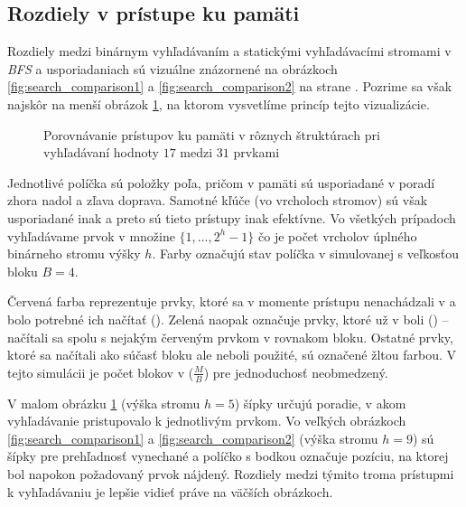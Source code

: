 \subsection{Rozdiely v prístupe ku pamäti} \label{sec:memaccess_patterns}
Rozdiely medzi binárnym vyhľadávaním a statickými vyhľadávacími stromami v \emph{BFS} a \vEB usporiadaniach sú vizuálne znázornené na obrázkoch \ref{fig:search_comparison1} a \ref{fig:search_comparison2} na strane \pageref{fig:search_comparison1}. Pozrime sa však najskôr na menší obrázok \ref{fig:search_comparison_small}, na ktorom vysvetlíme princíp tejto vizualizácie.

\begin{figure}[h]
    \centering
    \caption[Porovnávanie prístupov ku pamäti pri vyhľadávaní hodnoty $17$]{Porovnávanie prístupov ku pamäti v rôznych štruktúrach pri vyhľadávaní hodnoty $17$ medzi $31$ prvkami}
    \label{fig:search_comparison_small}
\end{figure}

Jednotlivé políčka sú položky poľa, pričom v pamäti sú usporiadané v poradí zhora nadol a zľava doprava. Samotné kľúče (vo vrcholoch stromov) sú však usporiadané inak a preto sú tieto prístupy inak efektívne. Vo všetkých prípadoch vyhľadávame prvok v množine $\{1, \dotsc, 2^h-1\}$ čo je počet vrcholov úplného binárneho stromu výšky $h$. Farby označujú stav políčka v simulovanej \cache s veľkosťou bloku $B=4$. 

Červená farba reprezentuje prvky, ktoré sa v momente prístupu nenachádzali v \cache a bolo potrebné ich načítať (\miss). Zelená naopak označuje prvky, ktoré už v \cache boli (\hit) -- načítali sa spolu s nejakým červeným prvkom v rovnakom bloku. Ostatné prvky, ktoré sa načítali ako súčasť bloku ale neboli použité, sú označené žltou farbou. V tejto simulácii je počet blokov v \cache ($\frac{M}{B}$) pre jednoduchosť neobmedzený.

V malom obrázku \ref{fig:search_comparison_small} (výška stromu $h=5$) šípky určujú poradie, v akom vyhľadávanie pristupovalo k jednotlivým prvkom. Vo veľkých obrázkoch \ref{fig:search_comparison1} a \ref{fig:search_comparison2} (výška stromu $h=9$) sú šípky pre prehľadnosť vynechané a políčko s bodkou označuje pozíciu, na ktorej bol napokon požadovaný prvok nájdený. Rozdiely medzi týmito troma prístupmi k vyhľadávaniu je lepšie vidieť práve na väčších obrázkoch.

